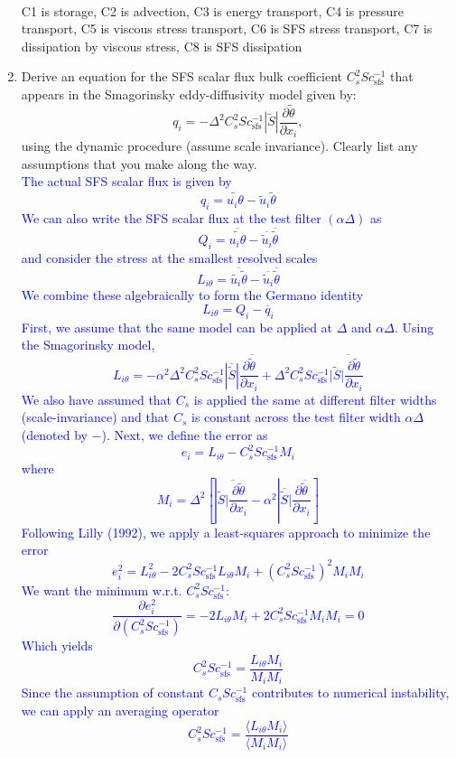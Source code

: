 \documentclass[11pt]{article}
\begin{document}
\begin{enumerate}
{\begin{align*}
\end{align*}
C1 is storage, C2 is advection, C3 is energy transport, C4 is pressure transport, C5 is viscous stress transport, C6 is SFS stress transport, C7 is dissipation by viscous stress, C8 is SFS dissipation
}
\item Derive an equation for the SFS scalar flux bulk coefficient $C_s^2Sc_{\text{sfs}}^{-1}$ that appears in the Smagorinsky eddy-diffusivity model given by:  
\begin{displaymath}
q_i=-\Delta^2 C_s^2Sc_{\text{sfs}}^{-1} |\widetilde{S}|\frac{\partial \widetilde{\theta}}{\partial x_i},
\end{displaymath}
using the dynamic procedure (assume scale invariance).  Clearly list any assumptions that you make along the way.\\
\textcolor{blue}{The actual SFS scalar flux is given by $$q_i = \widetilde{u_i \theta} - \widetilde{u}_i \widetilde{\theta}$$
We can also write the SFS scalar flux at the test filter $(\alpha \Delta)$ as
$$Q_i = \overline{\widetilde{u_i \theta}} - \overline{\widetilde{u}_i} \overline{\widetilde{\theta}}$$
and consider the stress at the smallest resolved scales
$$L_{i\theta} = \overline{\widetilde{u_i} \widetilde{\theta}} - \overline{\widetilde{u}_i} \overline{\widetilde{\theta}}$$
We combine these algebraically to form the Germano identity
$$L_{i\theta} = Q_i - \overline{q}_i$$
First, we assume that the same model can be applied at $\Delta$ and $\alpha \Delta$. Using the Smagorinsky model,
$$L_{i\theta} = -\alpha^2 \Delta^2 C_s^2Sc_{\text{sfs}}^{-1} |\overline{\widetilde{S}}|\frac{\partial \overline{\widetilde{\theta}}}{\partial x_i} +\Delta^2 C_s^2Sc_{\text{sfs}}^{-1} |\overline{\widetilde{S}|\frac{\partial \widetilde{\theta}}{\partial x_i}}$$
We also have assumed that $C_s$ is applied the same at different filter widths (scale-invariance) and that $C_s$ is constant across the test filter width $\alpha \Delta$ (denoted by $-$).
Next, we define the error as
$$e_i = L_{i\theta} - C_s^2Sc_{\text{sfs}}^{-1} M_i$$
where
$$M_i = \Delta^2 \left[ |\overline{\widetilde{S}|\frac{\partial \widetilde{\theta}}{\partial x_i}} - \alpha^2 |\overline{\widetilde{S}}|\frac{\partial \overline{\widetilde{\theta}}}{\partial x_i}\right]$$
Following Lilly (1992), we apply a least-squares approach to minimize the error
$$e_i^2 = L_{i\theta}^2 - 2C_s^2Sc_{\text{sfs}}^{-1} L_{i\theta} M_i + (C_s^2Sc_{\text{sfs}}^{-1})^2 M_i M_i$$
We want the minimum w.r.t. $C_s^2Sc_{\text{sfs}}^{-1}$:
$$\frac{\partial e_i^2}{\partial (C_s^2Sc_{\text{sfs}}^{-1})} = -2 L_{i\theta} M_i + 2 C_s^2Sc_{\text{sfs}}^{-1} M_i M_i = 0$$
Which yields
$$C_s^2Sc_{\text{sfs}}^{-1} = \frac{L_{i\theta} M_i}{M_i M_i}$$
Since the assumption of constant $C_sSc_{\text{sfs}}^{-1}$ contributes to numerical instability, we can apply an averaging operator
$$C_s^2Sc_{\text{sfs}}^{-1} = \frac{\langle L_{i\theta} M_i \rangle}{\langle M_i M_i \rangle}$$
}


\end{enumerate}
\end{document}
